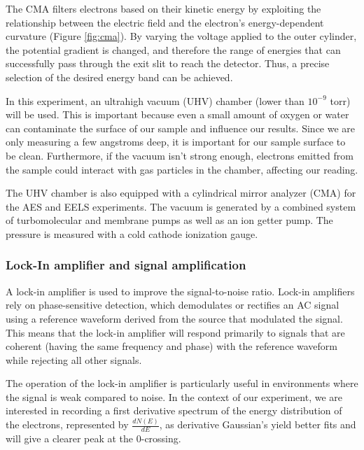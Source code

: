 \documentclass[12pt]{article}
\begin{document}
The CMA filters electrons based on their kinetic energy by exploiting the relationship between the electric field and the electron’s energy-dependent curvature (Figure \ref{fig:cma}). By varying the voltage applied to the outer cylinder, the potential gradient is changed, and therefore the range of energies that can successfully pass through the exit slit to reach the detector. Thus, a precise selection of the desired energy band can be achieved.


In this experiment, an ultrahigh vacuum (UHV) chamber (lower than $10^{-9}$ torr) will be used. This is important because even a small amount of oxygen or water can contaminate the surface of our sample and influence our results. Since we are only measuring a few angstroms deep, it is important for our sample surface to be clean. Furthermore, if the vacuum isn't strong enough, electrons emitted from the sample could interact with gas particles in the chamber, affecting our reading.

The UHV chamber is also equipped with a cylindrical mirror analyzer (CMA) for the AES and EELS experiments. The vacuum is generated by a combined system of turbomolecular and membrane pumps as well as an ion getter pump. The pressure is measured with a cold cathode ionization gauge.


\subsubsection{Lock-In amplifier and signal amplification}
A lock-in amplifier is used to improve the signal-to-noise ratio. Lock-in amplifiers rely on phase-sensitive detection, which demodulates or rectifies an AC signal using a reference waveform derived from the source that modulated the signal. This means that the lock-in amplifier will respond primarily to signals that are coherent (having the same frequency and phase) with the reference waveform while rejecting all other signals.

The operation of the lock-in amplifier is particularly useful in environments where the signal is weak compared to noise. In the context of our experiment, we are interested in recording a first derivative spectrum of the energy distribution of the electrons, represented by \( \frac{dN(E)}{dE} \), as derivative Gaussian's yield better fits and will give a clearer peak at the 0-crossing.
\end{document}
